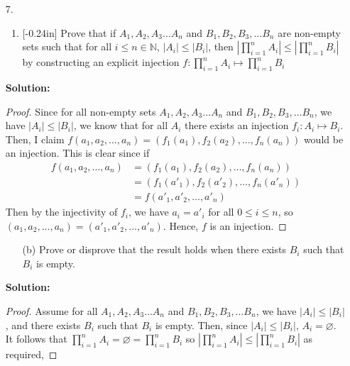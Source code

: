 \documentclass[letterpaper,12pt]{article}
\theoremstyle{definition}
\begin{document}
\begin{enumerate}
    \item[7.] \begin{enumerate}
        \item \reversemarginpar{}[-0.24in] Prove that if $A_1,A_2,A_3 \ldots A_n$ and $B_1,B_2,B_3,\ldots B_n$ are non-empty sets such that for all $i \leq n \in \mathbb{N}$, $|A_i| \leq |B_i|$, then $|\prod_{i = 1}^n A_i |\leq |\prod_{i = 1}^n B_i |$ by constructing an explicit injection $f: \prod_{i = 1}^n A_i  \mapsto \prod_{i = 1}^n B_i $
    \end{enumerate}
    \begin{mdframed}
            \textbf{Solution:}
            \begin{proof}
            Since for all non-empty sets $A_1,A_2,A_3 \ldots A_n$ and $B_1,B_2,B_3,\ldots B_n$, we have $|A_i| \leq |B_i|$, we know that for all $A_i$ there exists an injection $f_i: A_i \mapsto B_i$. Then, I claim  $f(a_1,a_2,\ldots,a_n) = (f_1(a_1),f_2(a_2),\ldots,f_n(a_n))$ would be an injection. This is clear since if \begin{align*}
                f(a_1,a_2,\ldots,a_n) &= (f_1(a_1),f_2(a_2),\ldots,f_n(a_n)) \\ &= (f_1(a'_1),f_2(a'_2),\ldots,f_n(a'_n))\\ &= f(a'_1,a'_2,\ldots,a'_n)
            \end{align*}Then by the injectivity of $f_i$, we have $a_i = a'_i$ for all $0 \leq i \leq n$, so $(a_1,a_2,\ldots,a_n) = (a'_1,a'_2,\ldots,a'_n)$. Hence, $f$ is an injection.
            \end{proof}
        \end{mdframed}
\end{enumerate}
\pagebreak
\begin{enumerate}
    \item[] \begin{enumerate}
        \item[(b)] Prove or disprove that the result holds when there exists $B_i$ such that $B_i$ is empty.
    \end{enumerate}
    \begin{mdframed}
            \textbf{Solution:}
            \begin{proof}
                Assume for all $A_1,A_2,A_3 \ldots A_n$ and $B_1,B_2,B_3,\ldots B_n$, we have $|A_i| \leq |B_i|$, and there exists $B_i$ such that $B_i$ is empty. Then, since $|A_i| \leq |B_i|$, $A_i = \varnothing$. It follows that $\prod_{i = 1}^n A_i =\varnothing =\prod_{i = 1}^n B_i $ so $|\prod_{i = 1}^n A_i |\leq |\prod_{i = 1}^n B_i |$ as required,
            \end{proof}
        \end{mdframed}
\end{enumerate}
\end{document}
